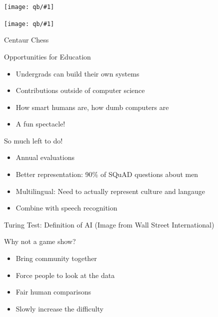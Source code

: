 \documentclass[xcolor=dvipsnames,xcolor=table]{beamer}
\newcommand{\fsi}[2]{
\begin{frame}[plain]
\vspace*{-1pt}
\makebox[\linewidth]{\texttt{[image: \#1]}}
\begin{center}
#2
\end{center}
\end{frame}
}
\newcommand{\gfxq}[2]{
\begin{center}
	\texttt{[image: qb/\#1]}
\end{center}
}
\begin{document}
\begin{frame}[plain]
\gfxq{seattle_crowd}{.5}
\gfxq{chicago_crowd}{.5}
\end{frame}

\fsi{qb/boring_dot_products}{}

\fsi{simtrans/centaur-chess}{Centaur Chess}

\begin{frame}{Opportunities for Education}

  \begin{itemize}
  \item Undergrads can build their own systems
  \item Contributions outside of computer science
  \item How smart humans are, how dumb computers are
  \item A fun spectacle!
  \end{itemize}

\end{frame}

\begin{frame}{So much left to do!}

  \begin{itemize}
  \item Annual evaluations
  \item Better representation: 90\% of SQuAD questions about men
  \item Multilingual: Need to actually represent culture and langauge
  \item Combine with speech recognition
  \end{itemize}
  
\end{frame}

\fsi{qb/turing}{Turing Test: Definition of AI (Image from Wall Street
  International)}

\begin{frame}{Why not a game show?}

  \begin{itemize}
  \item Bring community together
  \item Force people to look at the data
  \item Fair human comparisons
  \item Slowly increase the difficulty
  \end{itemize}

\end{frame}
\end{document}
